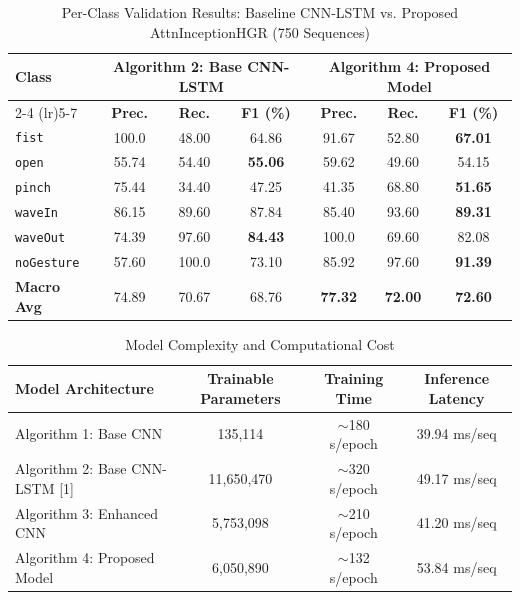 \documentclass[conference]{IEEEtran}
\begin{document}
\begin{table}[h]
\centering
\caption{Per-Class Validation Results: Baseline CNN-LSTM vs. Proposed AttnInceptionHGR (750 Sequences)}
\label{tab:per_class}
\begin{tabular}{lcccccc}
\toprule
\textbf{Class} & \multicolumn{3}{c}{\textbf{Algorithm 2: Base CNN-LSTM}} & \multicolumn{3}{c}{\textbf{Algorithm 4: Proposed Model}} \\
\cmidrule(lr){2-4} \cmidrule(lr){5-7}
& \textbf{Prec.} & \textbf{Rec.} & \textbf{F1 (\%)} & \textbf{Prec.} & \textbf{Rec.} & \textbf{F1 (\%)} \\
\midrule
\texttt{fist}      & 100.0 & 48.00 & 64.86 & 91.67 & 52.80 & \textbf{67.01} \\
\texttt{open}      & 55.74 & 54.40 & \textbf{55.06} & 59.62 & 49.60 & 54.15 \\
\texttt{pinch}     & 75.44 & 34.40 & 47.25 & 41.35 & 68.80 & \textbf{51.65} \\
\texttt{waveIn}    & 86.15 & 89.60 & 87.84 & 85.40 & 93.60 & \textbf{89.31} \\
\texttt{waveOut}   & 74.39 & 97.60 & \textbf{84.43} & 100.0 & 69.60 & 82.08 \\
\texttt{noGesture} & 57.60 & 100.0 & 73.10 & 85.92 & 97.60 & \textbf{91.39} \\
\midrule
\textbf{Macro Avg} & 74.89 & 70.67 & 68.76 & \textbf{77.32} & \textbf{72.00} & \textbf{72.60} \\
\bottomrule
\end{tabular}
\end{table}

\begin{table}[h]
\centering
\caption{Model Complexity and Computational Cost}
\label{tab:cost}
\begin{tabular}{lccc}
\toprule
\textbf{Model Architecture} & \textbf{Trainable Parameters} & \textbf{Training Time} & \textbf{Inference Latency} \\
\midrule
Algorithm 1: Base CNN & 135,114 & $\sim$180 s/epoch & 39.94 ms/seq \\
Algorithm 2: Base CNN-LSTM [1] & 11,650,470 & $\sim$320 s/epoch & 49.17 ms/seq \\
Algorithm 3: Enhanced CNN & 5,753,098 & $\sim$210 s/epoch & 41.20 ms/seq \\
Algorithm 4: Proposed Model & 6,050,890 & $\sim$132 s/epoch & 53.84 ms/seq \\
\bottomrule
\end{tabular}
\end{table}
\end{document}
